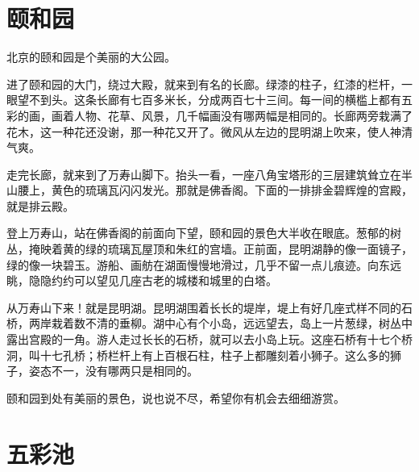 \documentclass[12pt,UTF-8,openany]{ctexbook}
\begin{document}
\chapter{颐和园}

\begin{large}
    
    北京的颐和园是个美丽的大公园。
    
    进了颐和园的大门，绕过大殿，就来到有名的长廊。绿漆的柱子，红漆的栏杆，一眼望不到头。这条长廊有七百多米长，分成两百七十三间。每一间的横槛上都有五彩的画，画着人物、花草、风景，几千幅画没有哪两幅是相同的。长廊两旁栽满了花木，这一种花还没谢，那一种花又开了。微风从左边的昆明湖上吹来，使人神清气爽。
    
    走完长廊，就来到了万寿山脚下。抬头一看，一座八角宝塔形的三层建筑耸立在半山腰上，黄色的琉璃瓦闪闪发光。那就是佛香阁。下面的一排排金碧辉煌的宫殿，就是排云殿。
    
    登上万寿山，站在佛香阁的前面向下望，颐和园的景色大半收在眼底。葱郁的树丛，掩映着黄的绿的琉璃瓦屋顶和朱红的宫墙。正前面，昆明湖静的像一面镜子，绿的像一块碧玉。游船、画舫在湖面慢慢地滑过，几乎不留一点儿痕迹。向东远眺，隐隐约约可以望见几座古老的城楼和城里的白塔。
    
    从万寿山下来！就是昆明湖。昆明湖围着长长的堤岸，堤上有好几座式样不同的石桥，两岸栽着数不清的垂柳。湖中心有个小岛，远远望去，岛上一片葱绿，树丛中露出宫殿的一角。游人走过长长的石桥，就可以去小岛上玩。这座石桥有十七个桥洞，叫十七孔桥；桥栏杆上有上百根石柱，柱子上都雕刻着小狮子。这么多的狮子，姿态不一，没有哪两只是相同的。
    
    颐和园到处有美丽的景色，说也说不尽，希望你有机会去细细游赏。
    
\end{large}



\chapter{五彩池}
\end{document}
